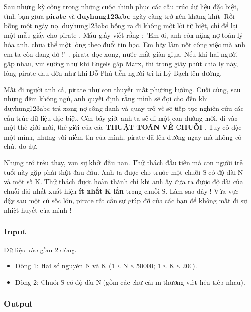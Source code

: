 



   Sau những kỳ công trong những cuộc chinh phục các cấu trúc dữ liệu đặc biệt, tình bạn giữa   \textbf{pirate}   và   \textbf{duyhung123abc}   ngày càng trở nên khăng khít. Rồi bỗng một ngày nọ,   duyhung123abc   bỗng ra đi không một lời từ biệt, chỉ để lại một mẫu giấy cho   pirate   . Mẩu giấy viết rằng :   "Em ơi, anh còn nặng nợ toán lý hóa anh, chưa thể một lòng theo đuổi tin học. Em hãy làm nốt công việc mà anh em ta còn dang dở !"   .   pirate   đọc xong, nước mắt giàn giụa. Nếu khi hai người gặp nhau, vui sướng như khi Engels gặp Marx, thì trong giây phút chia ly này, lòng   pirate   đau đớn như khi Đỗ Phủ tiễn người tri kỉ Lý Bạch lên đường.  

   Mất đi người anh cả,   pirate   như con thuyền mất phương hướng. Cuối cùng, sau những đêm không ngủ, anh quyết định rằng mình sẽ đợi cho đến khi   duyhung123abc   trả xong nợ công danh và quay trở về sẽ tiếp tục nghiên cứu các cấu trúc dữ liệu đặc biệt. Còn bây giờ, anh ta sẽ đi một con đường mới, đi vào một thế giới mới, thế giới của các   \textbf{    THUẬT TOÁN VỀ CHUỖI   }   . Tuy cô độc một mình, nhưng với niềm tin của mình,   pirate   đã lên đường ngay mà không có chút do dự.  

   Nhưng trớ trêu thay, vạn sự khởi đầu nan. Thử thách đầu tiên mà con người trẻ tuổi này gặp phải thật đau đầu. Anh ta được cho trước một chuỗi S có độ dài N và một số K. Thử thách được hoàn thành chỉ khi anh ấy đưa ra được độ dài của chuỗi dài nhất xuất hiện   \textbf{    ít nhất K lần   }   trong chuỗi S. Làm sao đây ! Vừa vực dậy sau một cú sốc lớn,   pirate   rất cần sự giúp đỡ của các bạn để không mất đi sự nhiệt huyết của mình !  

\subsubsection{   Input  }

   Dữ liệu vào gồm 2 dòng:  
\begin{itemize}
	\item     Dòng 1: Hai số nguyên N và K (1 ≤ N ≤ 50000; 1 ≤ K ≤ 200).   
	\item     Dòng 2: Chuỗi S có độ dài N (gồm các chữ cái in thương viết liên tiếp nhau).   
\end{itemize}



\subsubsection{   Output  }

